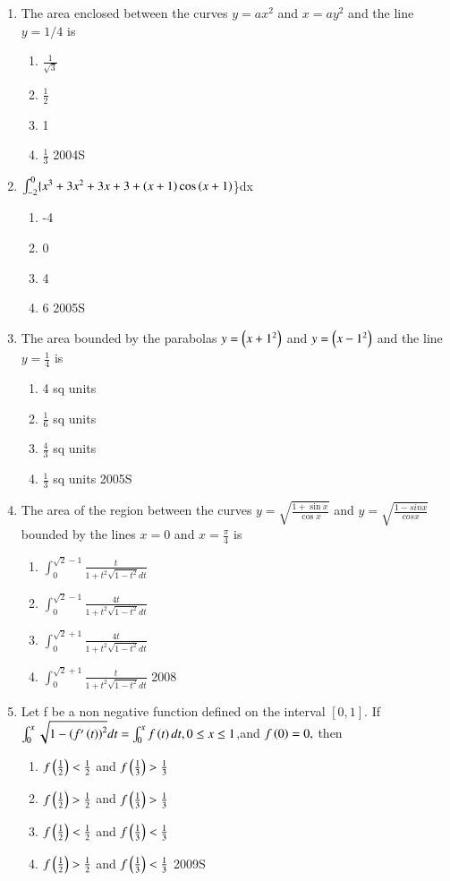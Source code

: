 \documentclass[journal,12pt,twocolumn]{IEEEtran}
\theoremstyle{remark}
\begin{document}
\begin{enumerate}
\begin{enumerate}
 \end{enumerate}
 \item The area enclosed between the curves $y=ax^{2}$ and $x=ay^{2}$ and the line $y=1/4$ is
 \begin{enumerate}
	 \item $\frac{1}{\sqrt{3}}$
	 \item $\frac{1}{2}$
     \item 1
     \item $\frac{1}{3}$
     \hfill{{2004S}}
 \end{enumerate}
 \item $\int_{-2}^{0}\{x^{3}+3x^{2}+3x+3+\left(x+1\right)\cos\left(x+1\right)$\}dx
\begin{enumerate}
 \item -4
 \item 0
 \item 4
 \item 6
 \hfill{{2005S}}
\end{enumerate}
  \item The area bounded by the parabolas $y=\left(x+1^{2}\right)$ and $y=\left(x-1^{2}\right)$ and the line $y=\frac{1}{4}$ is
\begin{enumerate}
    \item 4 sq units
    \item $\frac{1}{6}$ sq units
    \item $\frac{4}{3}$ sq units
    \item $\frac{1}{3}$ sq units
    \hfill{{2005S}}
\end{enumerate}
 \item The area of the region between the curves $y=\sqrt{\frac{1+\sin x}{\cos x}}$ and $y=\sqrt{\frac{1-sin x}{cos x}}$ bounded by the lines $x=0$ and $x=\frac{\pi}{4}$ is
\begin{enumerate}
    \item $\int_{0}^{\sqrt{2}-1}\frac{t}{1+t^{2}\sqrt{1-t^{2}}dt}$
       \item $\int_{0}^{\sqrt{2}-1}\frac{4t}{1+t^{2}\sqrt{1-t^{2}}dt}$
      \item $\int_{0}^{\sqrt{2}+1}\frac{4t}{1+t^{2}\sqrt{1-t^{2}}dt}$ 
         \item $\int_{0}^{\sqrt{2}+1}\frac{t}{1+t^{2}\sqrt{1-t^{2}}dt}$
         \hfill{{2008}}
\end{enumerate}
\item Let f be a non negative function defined on the interval $[0,1]$. If $\int_{0}^{x}\sqrt{1-\left(f'\left(t\right)\right)^{2}}dt=\int_{0}^{x}f\left(t\right)dt,0\leq{x}\leq1$,and $f\left(0\right)=0,$ then
\begin{enumerate}
    \item$ f\left(\frac{1}{2}\right)<\frac{1}{2}$ and $f\left(\frac{1}{3}\right)>\frac{1}{3}$
    \item$ f\left(\frac{1}{2}\right)>\frac{1}{2}$ and $f\left(\frac{1}{3}\right)>\frac{1}{3}$
  \item$ f\left(\frac{1}{2}\right)<\frac{1}{2}$ and $f\left(\frac{1}{3}\right)<\frac{1}{3}$
  \item$ f\left(\frac{1}{2}\right)>\frac{1}{2}$ and $f\left(\frac{1}{3}\right)<\frac{1}{3}$
  \hfill{{2009S}}
\end{enumerate}
\end{enumerate}
\end{document}
